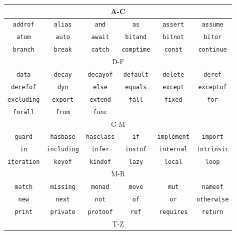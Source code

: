 \begin{table}[h]
	\centering
	\begin{tabular}{|c c c c c c|} \hline
		\multicolumn{6}{|c|}{A-C} \\\hline
		\lstinline!addrof! & \lstinline!alias! & \lstinline!and! & \lstinline!as! & \lstinline!assert! & \lstinline!assume! \\
		\lstinline!atom! & \lstinline!auto! & \lstinline!await! & \lstinline!bitand! & \lstinline!bitnot! & \lstinline!bitor! \\
		\lstinline!branch! & \lstinline!break! & \lstinline!catch! & \lstinline!comptime! & \lstinline!const! & \lstinline!continue! \\\hline
		\multicolumn{6}{|c|}{D-F} \\\hline
		\lstinline!data! & \lstinline!decay! & \lstinline!decayof! & \lstinline!default! & \lstinline!delete! & \lstinline!deref! \\
		\lstinline!derefof! & \lstinline!dyn! & \lstinline!else! & \lstinline!equals! & \lstinline!except! & \lstinline!exceptof! \\
		\lstinline!excluding! & \lstinline!export! & \lstinline!extend! & \lstinline!fall! & \lstinline!fixed! & \lstinline!for! \\
		\lstinline!forall! & \lstinline!from! & \lstinline!func! & & & \\\hline
		\multicolumn{6}{|c|}{G-M} \\\hline
		\lstinline!guard! & \lstinline!hasbase! & \lstinline!hasclass! & \lstinline!if! & \lstinline!implement! & \lstinline!import! \\
		\lstinline!in! & \lstinline!including! & \lstinline!infer! & \lstinline!instof! & \lstinline!internal! & \lstinline!intrinsic! \\
		\lstinline!iteration! & \lstinline!keyof! & \lstinline!kindof! & \lstinline!lazy! & \lstinline!local! & \lstinline!loop! \\\hline
		\multicolumn{6}{|c|}{M-R} \\\hline
		\lstinline!match! & \lstinline!missing! & \lstinline!monad! & \lstinline!move! & \lstinline!mut! & \lstinline!nameof! \\
	    \lstinline!new! & \lstinline!next! & \lstinline!not! & \lstinline!of! & \lstinline!or! & \lstinline!otherwise! \\
		 \lstinline!print! & \lstinline!private! & \lstinline!protoof! & \lstinline!ref! & \lstinline!requires! & \lstinline!return! \\\hline
		\multicolumn{6}{|c|}{T-Z} \\\hline

\end{tabular}
\end{table}
